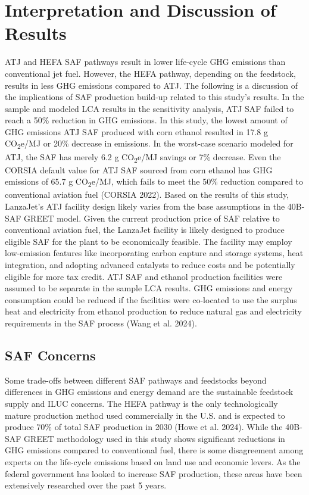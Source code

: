 \documentclass[12pt]{article}
\begin{document}
\section{Interpretation and Discussion of Results}
ATJ and HEFA SAF pathways result in lower life-cycle GHG emissions than conventional jet fuel. However, the HEFA pathway, depending on the feedstock, results in less GHG emissions compared to ATJ. The following is a discussion of the implications of SAF production build-up related to this study’s results. 
In the sample and modeled LCA results in the sensitivity analysis, ATJ SAF failed to reach a 50\% reduction in GHG emissions. In this study, the lowest amount of GHG emissions ATJ SAF produced with corn ethanol resulted in 17.8 g CO\textsubscript{2}e/MJ or 20\% decrease in emissions. In the worst-case scenario modeled for ATJ, the SAF has merely 6.2 g CO\textsubscript{2}e/MJ savings or 7\% decrease. Even the CORSIA default value for ATJ SAF sourced from corn ethanol has GHG emissions of 65.7 g CO\textsubscript{2}e/MJ, which fails to meet the 50\% reduction compared to conventional aviation fuel (CORSIA 2022). 
Based on the results of this study, LanzaJet’s ATJ facility design likely varies from the base assumptions in the 40B-SAF GREET model. Given the current production price of SAF relative to conventional aviation fuel, the LanzaJet facility is likely designed to produce eligible SAF for the plant to be economically feasible. The facility may employ low-emission features like incorporating carbon capture and storage systems, heat integration, and adopting advanced catalysts to reduce costs and be potentially eligible for more tax credit. ATJ SAF and ethanol production facilities were assumed to be separate in the sample LCA results. GHG emissions and energy consumption could be reduced if the facilities were co-located to use the surplus heat and electricity from ethanol production to reduce natural gas and electricity requirements in the SAF process (Wang et al. 2024). 

\subsection{SAF Concerns}

Some trade-offs between different SAF pathways and feedstocks beyond differences in GHG emissions and energy demand are the sustainable feedstock supply and ILUC concerns. The HEFA pathway is the only technologically mature production method used commercially in the U.S. and is expected to produce 70\% of total SAF production in 2030 (Howe et al. 2024). While the 40B-SAF GREET methodology used in this study shows significant reductions in GHG emissions compared to conventional fuel, there is some disagreement among experts on the life-cycle emissions based on land use and economic levers. As the federal government has looked to increase SAF production, these areas have been extensively researched over the past 5 years. 
\end{document}
